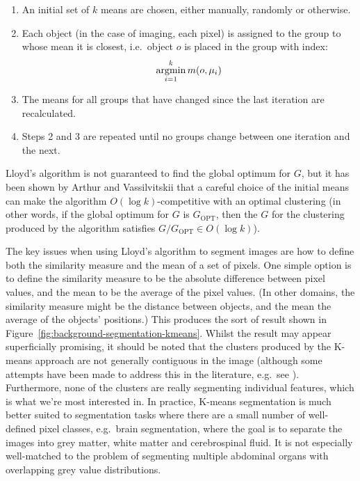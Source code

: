 \begin{enumerate}

\item An initial set of $k$ means are chosen, either manually, randomly or otherwise.

\item Each object (in the case of imaging, each pixel) is assigned to the group to whose mean it is closest, i.e.~object $o$ is placed in the group with index:
%
\[
\mathop{\rm argmin}_{i=1}^k m(o, \mu_i)
\]

\item The means for all groups that have changed since the last iteration are recalculated.

\item Steps 2 and 3 are repeated until no groups change between one iteration and the next.

\end{enumerate}

\noindent Lloyd's algorithm is not guaranteed to find the global optimum for $G$, but it has been shown by Arthur and Vassilvitskii \cite{arthur07} that a careful choice of the initial means can make the algorithm $O(\log k)$-competitive with an optimal clustering (in other words, if the global optimum for $G$ is $G_{\mbox{OPT}}$, then the $G$ for the clustering produced by the algorithm satisfies $G / G_{\mbox{OPT}} \in O(\log k)$).

The key issues when using Lloyd's algorithm to segment images are how to define both the similarity measure and the mean of a set of pixels. One simple option is to define the similarity measure to be the absolute difference between pixel values, and the mean to be the average of the pixel values. (In other domains, the similarity measure might be the distance between objects, and the mean the average of the objects' positions.) This produces the sort of result shown in Figure~\ref{fig:background-segmentation-kmeans}. Whilst the result may appear superficially promising, it should be noted that the clusters produced by the K-means approach are not generally contiguous in the image (although some attempts have been made to address this in the literature, e.g.~see \cite{luo03,ilea06}). Furthermore, none of the clusters are really segmenting individual features, which is what we're most interested in. In practice, K-means segmentation is much better suited to segmentation tasks where there are a small number of well-defined pixel classes, e.g.~brain segmentation, where the goal is to separate the images into grey matter, white matter and cerebrospinal fluid. It is not especially well-matched to the problem of segmenting multiple abdominal organs with overlapping grey value distributions.


